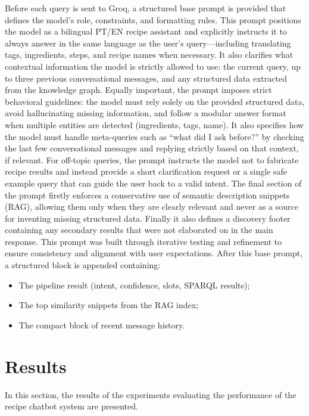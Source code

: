 \documentclass{article}
\begin{document}
Before each query is sent to Groq, a structured base prompt is provided that defines the model’s role, constraints, and formatting rules. This prompt positions the model as a bilingual PT/EN recipe assistant and explicitly instructs it to always answer in the same language as the user’s query—including translating tags, ingredients, steps, and recipe names when necessary. It also clarifies what contextual information the model is strictly allowed to use: the current query, up to three previous conversational messages, and any structured data extracted from the knowledge graph. Equally important, the prompt imposes strict behavioral guidelines: the model must rely solely on the provided structured data, avoid hallucinating missing information, and follow a modular answer format when multiple entities are detected (ingredients, tags, name). It also specifies how the model must handle meta-queries such as “what did I ask before?” by checking the last few conversational messages and replying strictly based on that context, if relevant. For off-topic queries, the prompt instructs the model not to fabricate recipe results and instead provide a short clarification request or a single safe example query that can guide the user back to a valid intent. The final section of the prompt firstly enforces a conservative use of semantic description snippets (RAG), allowing them only when they are clearly relevant and never as a source for inventing missing structured data. Finally it also defines a discovery footer containing any secondary results that were not elaborated on in the main response. This prompt was built through iterative testing and refinement to ensure consistency and alignment with user expectations. After this base prompt, a structured block is appended containing:
\begin{itemize}
    \item The pipeline result (intent, confidence, slots, SPARQL results);
    \item The top similarity snippets from the RAG index;
    \item The compact block of recent message history.
\end{itemize}




\section{Results}
\noindent
In this section, the results of the experiments evaluating the performance of the recipe chatbot system are presented.
\end{document}
